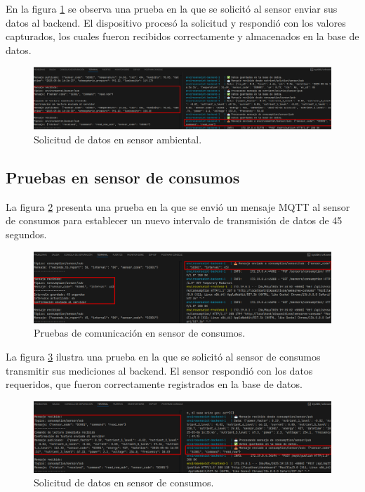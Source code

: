 En la figura \ref{fig:prueba_mqtt_sensor_ambiental_2} se observa una prueba en
la que se solicitó al sensor enviar sus datos al backend. El dispositivo
procesó la solicitud y respondió con los valores capturados, los cuales fueron
recibidos correctamente y almacenados en la base de datos.

\begin{figure}[H]
    \centering
    \includegraphics[width=\textwidth]{Images/55_prueba_mqtt_sensor_ambiental_2.png}
    \caption[Solicitud de datos en sensor ambiental]{Solicitud de datos en sensor ambiental.}
    \label{fig:prueba_mqtt_sensor_ambiental_2}
\end{figure}

\subsection{Pruebas en sensor de consumos}

La figura \ref{fig:prueba_mqtt_sensor_consumos_1} presenta una prueba en la que
se envió un mensaje MQTT al sensor de consumos para establecer un nuevo
intervalo de transmisión de datos de 45 segundos.

\begin{figure}[H]
    \centering
    \includegraphics[width=\textwidth]{Images/56_prueba_mqtt_sensor_consumos_1.png}
    \caption[Pruebas de comunicación en sensor de consumos]{Pruebas de comunicación en sensor de consumos.}
    \label{fig:prueba_mqtt_sensor_consumos_1}
\end{figure}

La figura \ref{fig:prueba_mqtt_sensor_consumos_2} ilustra una prueba en la que
se solicitó al sensor de consumos transmitir sus mediciones al backend. El
sensor respondió con los datos requeridos, que fueron correctamente registrados
en la base de datos.

\begin{figure}[H]
    \centering
    \includegraphics[width=\textwidth]{Images/56_prueba_mqtt_sensor_consumos_2.png}
    \caption[Solicitud de datos en sensor de consumos]{Solicitud de datos en sensor de consumos.}
    \label{fig:prueba_mqtt_sensor_consumos_2}
\end{figure}

